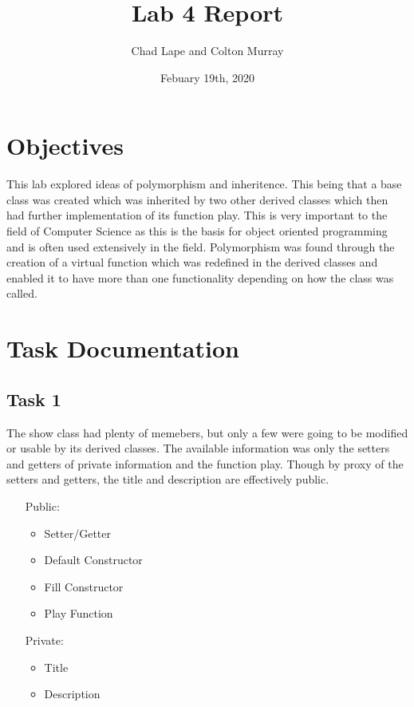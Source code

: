 \documentclass[10pt]{article}
\title{Lab 4 Report}
\author{Chad Lape and Colton Murray}
\date{Febuary 19th, 2020}
\begin{document}
	\maketitle
	
	\section{Objectives}
	This lab explored ideas of polymorphism and inheritence. This being that a base class was created which was inherited by two other derived classes which then had further implementation of its function play. This is very important to the field of Computer Science as this is the basis for object oriented programming and is often used extensively in the field. Polymorphism was found through the creation of a virtual function which was redefined in the derived classes and enabled it to have more than one functionality depending on how the class was called.
	
	\newpage
	\section{Task Documentation} 
	\subsection{Task 1}
	The show class had plenty of memebers, but only a few were going to be modified or usable by its derived classes. The available information was only the setters and getters of private information and the function play. Though by proxy of the setters and getters, the title and description are effectively public.
	\begin{itemize}
	\item [Public:]
		\begin{itemize}
			\item Setter/Getter
			\item Default Constructor
			\item Fill Constructor
			\item Play Function
		\end{itemize}
	\item [Private:]
		\begin{itemize}
			\item Title
			\item Description
		\end{itemize}
	\end{itemize}
\end{document}
